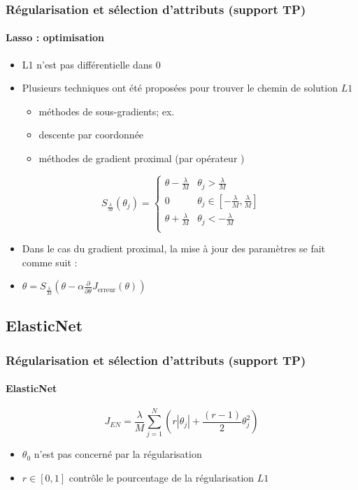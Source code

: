 \documentclass[xcolor=table]{beamer}
\begin{document}
\begin{frame}
	\frametitle{Régularisation et sélection d'attributs (support TP)}
	\framesubtitle{Lasso : optimisation}
	
	\begin{itemize}
		\item L1 n'est pas différentielle dans $0$
		\item Plusieurs techniques ont été proposées pour trouver le chemin de solution $L1$
		\begin{itemize}
			\item méthodes de sous-gradients; ex. 
			\item descente par coordonnée
			\item méthodes de gradient proximal (par opérateur )
		\end{itemize}
	\end{itemize}

	\[S_\frac{\lambda}{M} (\theta_j) = 
	\begin{cases}
		\theta - \frac{\lambda}{M} & \theta_j > \frac{\lambda}{M} \\
		0 & \theta_j \in [-\frac{\lambda}{M}, \frac{\lambda}{M}] \\
		\theta + \frac{\lambda}{M} & \theta_j < -\frac{\lambda}{M} \\
	\end{cases}
	\]
	
	\begin{itemize}
		\item Dans le cas du gradient proximal, la mise à jour des paramètres se fait comme suit : 
		\item $\theta = S_\frac{\lambda}{M} (\theta - \alpha \frac{\partial}{\partial \theta} J_\text{erreur}(\theta)) $
	\end{itemize}
	
\end{frame}

\subsection{ElasticNet}

\begin{frame}
	\frametitle{Régularisation et sélection d'attributs (support TP)}
	\framesubtitle{ElasticNet}
	
	\[J_{EN} = \frac{\lambda}{M} \sum_{j=1}^{N} \left( r  |\theta_j| + \frac{(r-1)}{2} \theta_j^2\right)\]
	
	\begin{itemize}
		\item $\theta_0$ n'est pas concerné par la régularisation
		\item $r \in [0, 1]$ contrôle le pourcentage de la régularisation $L1$
	\end{itemize}
	
\end{frame}
\end{document}

